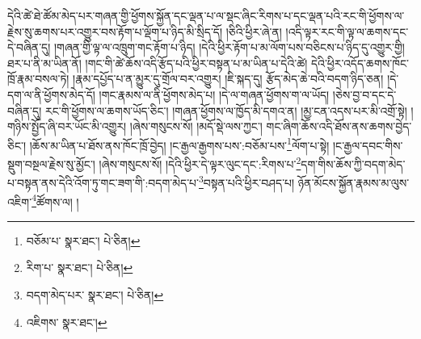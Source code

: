 དེའི་ཚེ་ཐེ་ཚོམ་མེད་པར་གཞན་གྱི་ཕྱོགས་སྐྱོན་དང་ལྡན་པ་ལ་སྡང་ཞིང་རིགས་པ་དང་ལྡན་པའི་རང་གི་ཕྱོགས་ལ་རྗེས་སུ་ཆགས་པར་འགྱུར་བས་རྟོག་པ་ལྡོག་པ་ཉིད་མི་སྲིད་དོ། །ཅིའི་ཕྱིར་ཞེ་ན། །འདི་ལྟར་རང་གི་ལྟ་ལ་ཆགས་དང་དེ་བཞིན་དུ། །གཞན་གྱི་ལྟ་ལ་འཁྲུག་གང་རྟོག་པ་ཉིད། །དེའི་ཕྱིར་རྟོག་པ་མ་ལོག་པས་བཅིངས་པ་ཉིད་དུ་འགྱུར་གྱི། ཐར་པ་ནི་མ་ཡིན་ནོ། །གང་གི་ཚེ་ཆོས་འདི་རྩོད་པའི་ཕྱིར་བསྟན་པ་མ་ཡིན་པ་དེའི་ཚེ། དེའི་ཕྱིར་འདོད་ཆགས་ཁོང་ཁྲོ་རྣམ་བསལ་ཏེ། །རྣམ་དཔྱོད་པ་ན་མྱུར་དུ་གྲོལ་བར་འགྱུར། །ཇི་སྐད་དུ། རྩོད་མེད་ཆེ་བའི་བདག་ཉིད་ཅན། །དེ་དག་ལ་ནི་ཕྱོགས་མེད་དོ། །གང་རྣམས་ལ་ནི་ཕྱོགས་མེད་པ། །དེ་ལ་གཞན་ཕྱོགས་ག་ལ་ཡོད། །ཅེས་བྱ་བ་དང་དེ་བཞིན་དུ། རང་གི་ཕྱོགས་ལ་ཆགས་ཡོད་ཅིང་། །གཞན་ཕྱོགས་ལ་ཁྱོད་མི་དགའ་ན། །མྱ་ངན་འདས་པར་མི་འགྲོ་སྟེ། །གཉིས་སྤྱོད་ཞི་བར་ཡོང་མི་འགྱུར། །ཞེས་གསུངས་སོ། །མདོ་སྡེ་ལས་ཀྱང་། གང་ཞིག་ཆོས་འདི་ཐོས་ནས་ཆགས་བྱེད་ཅིང་། །ཆོས་མ་ཡིན་པ་ཐོས་ནས་ཁོང་ཁྲོ་བྱེད། །ང་རྒྱལ་རྒྱགས་པས་:བཅོམ་པས་\footnote{བཅོམ་པ་  སྣར་ཐང་།  པེ་ཅིན། }ལོག་པ་སྟེ། །ང་རྒྱལ་དབང་གིས་སྡུག་བསྔལ་རྗེས་སུ་མྱོང་། །ཞེས་གསུངས་སོ། །དེའི་ཕྱིར་དེ་ལྟར་ལུང་དང་:རིགས་པ་\footnote{རིག་པ་  སྣར་ཐང་།  པེ་ཅིན། }དག་གིས་ཆོས་ཀྱི་བདག་མེད་པ་བསྟན་ནས་དེའི་འོག་ཏུ་གང་ཟག་གི་:བདག་མེད་པ་\footnote{བདག་མེད་པར་  སྣར་ཐང་།  པེ་ཅིན། }བསྟན་པའི་ཕྱིར་བཤད་པ། ཉོན་མོངས་སྐྱོན་རྣམས་མ་ལུས་འཇིག་\footnote{འཇིགས་  སྣར་ཐང་། }ཚོགས་ལ། །
